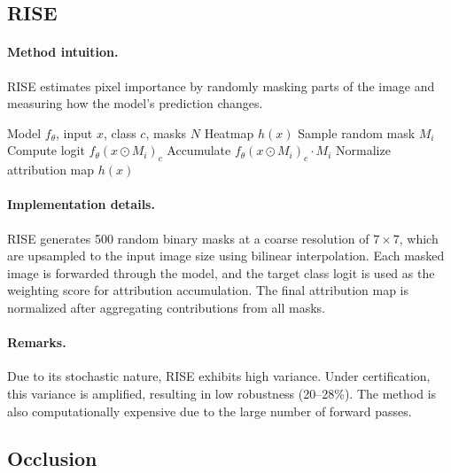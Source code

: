 \documentclass[11pt]{article}
\begin{document}
\subsection{RISE}

\paragraph{Method intuition.}
RISE estimates pixel importance by randomly masking parts of the image and measuring how the model’s prediction changes.

\begin{algorithm}[H]
\caption{RISE}
\label{alg:rise}
\begin{algorithmic}[1]
\REQUIRE Model $f_\theta$, input $x$, class $c$, masks $N$
\ENSURE Heatmap $h(x)$
    \STATE Sample random mask $M_i$
    \STATE Compute logit $f_\theta(x \odot M_i)_c$
    \STATE Accumulate $f_\theta(x \odot M_i)_c \cdot M_i$
\ENDFOR
\STATE Normalize attribution map
\RETURN $h(x)$
\end{algorithmic}
\end{algorithm}

\paragraph{Implementation details.}
RISE generates 500 random binary masks at a coarse resolution of $7 \times 7$, which are upsampled to the input image size using bilinear interpolation. Each masked image is forwarded through the model, and the target class logit is used as the weighting score for attribution accumulation. The final attribution map is normalized after aggregating contributions from all masks.

\paragraph{Remarks.}
Due to its stochastic nature, RISE exhibits high variance. Under certification, this variance is amplified, resulting in low robustness (20--28\%). The method is also computationally expensive due to the large number of forward passes.

\subsection{Occlusion}
\end{document}
